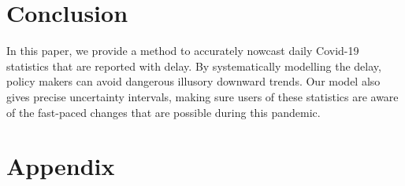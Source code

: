 \documentclass[a4paper,11pth]{article}
\begin{document}
\section{Conclusion}
In this paper, we provide a method to accurately nowcast daily Covid-19 statistics that are reported with delay. By systematically modelling the delay, policy makers can avoid dangerous illusory downward trends. Our model also gives precise uncertainty intervals, making sure users of these statistics are aware of the fast-paced changes that are possible during this pandemic.



\appendix
\section{Appendix}
%
\end{document}
